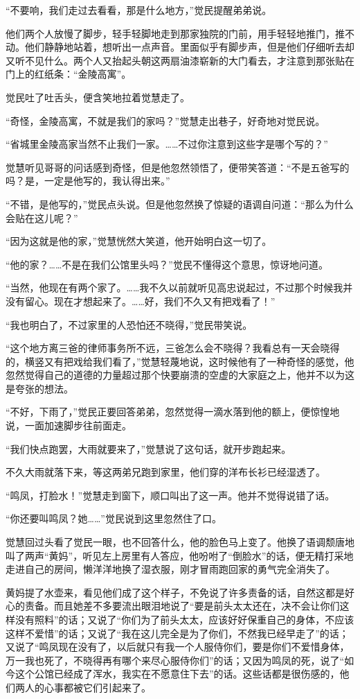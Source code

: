 \par “不要响，我们走过去看看，那是什么地方，”觉民提醒弟弟说。
\par 他们两个人放慢了脚步，轻手轻脚地走到那家独院的门前，用手轻轻地推门，推不动。他们静静地站着，想听出一点声音。里面似乎有脚步声，但是他们仔细听去却又听不见什么。两个人又抬起头朝这两扇油漆崭新的大门看去，才注意到那张贴在门上的红纸条：“金陵高寓”。
\par 觉民吐了吐舌头，便含笑地拉着觉慧走了。
\par “奇怪，金陵高寓，不就是我们的家吗？”觉慧走出巷子，好奇地对觉民说。
\par “省城里金陵高家当然不止我们一家。……不过你注意到这些字是哪个写的？”
\par 觉慧听见哥哥的问话感到奇怪，但是他忽然领悟了，便带笑答道：“不是五爸写的吗？是，一定是他写的，我认得出来。”
\par “不错，是他写的，”觉民点头说。但是他忽然换了惊疑的语调自问道：“那么为什么会贴在这儿呢？”
\par “因为这就是他的家，”觉慧恍然大笑道，他开始明白这一切了。
\par “他的家？……不是在我们公馆里头吗？”觉民不懂得这个意思，惊讶地问道。
\par “当然，他现在有两个家了。……我不久以前就听见高忠说起过，不过那个时候我并没有留心。现在才想起来了。……好，我们不久又有把戏看了！”
\par “我也明白了，不过家里的人恐怕还不晓得，”觉民带笑说。
\par “这个地方离三爸的律师事务所不远，三爸怎么会不晓得？我看总有一天会晓得的，横竖又有把戏给我们看了，”觉慧轻蔑地说，这时候他有了一种奇怪的感觉，他忽然觉得自己的道德的力量超过那个快要崩溃的空虚的大家庭之上，他并不以为这是夸张的想法。
\par “不好，下雨了，”觉民正要回答弟弟，忽然觉得一滴水落到他的额上，便惊惶地说，一面加速脚步往前面走。
\par “我们快点跑罢，大雨就要来了，”觉慧说了这句话，就开步跑起来。
\par 不久大雨就落下来，等这两弟兄跑到家里，他们穿的洋布长衫已经湿透了。
\par “鸣凤，打脸水！”觉慧走到窗下，顺口叫出了这一声。他并不觉得说错了话。
\par “你还要叫鸣凤？她……”觉民说到这里忽然住了口。
\par 觉慧回过头看了觉民一眼，也不回答什么，他的脸色马上变了。他换了语调颓唐地叫了两声“黄妈”，听见左上房里有人答应，他吩咐了“倒脸水”的话，便无精打采地走进自己的房间，懒洋洋地换了湿衣服，刚才冒雨跑回家的勇气完全消失了。
\par 黄妈提了水壶来，看见他们成了这个样子，不免说了许多责备的话，自然这都是好心的责备。而且她差不多要流出眼泪地说了“要是前头太太还在，决不会让你们这样没有照料”的话；又说了“你们为了前头太太，应该好好保重自己的身体，不应该这样不爱惜”的话；又说了“我在这儿完全是为了你们，不然我已经早走了”的话；又说了“鸣凤现在没有了，以后就只有我一个人服侍你们，要是你们不爱惜身体，万一我也死了，不晓得再有哪个来尽心服侍你们”的话；又因为鸣凤的死，说了“如今这个公馆已经成了浑水，我实在不愿意住下去”的话。这些话都是很伤感的，他们两人的心事都被它们引起来了。

